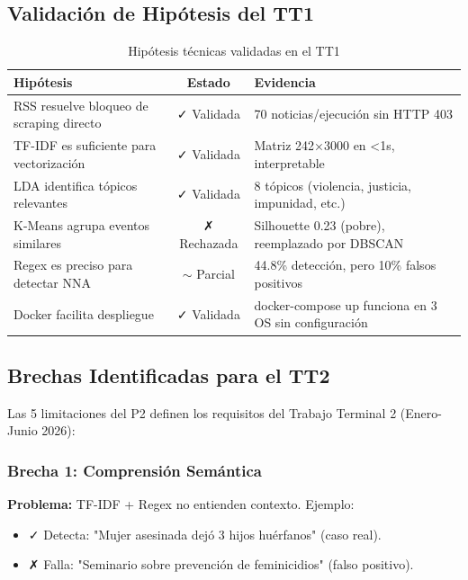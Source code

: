 \subsection{Validación de Hipótesis del TT1}

\begin{table}[h]
\centering
\caption{Hipótesis técnicas validadas en el TT1}
\begin{tabular}{|p{5cm}|c|p{5cm}|}
\hline
\textbf{Hipótesis} & \textbf{Estado} & \textbf{Evidencia} \\ \hline
RSS resuelve bloqueo de scraping directo & ✓ Validada & 70 noticias/ejecución sin HTTP 403 \\ \hline
TF-IDF es suficiente para vectorización & ✓ Validada & Matriz 242×3000 en <1s, interpretable \\ \hline
LDA identifica tópicos relevantes & ✓ Validada & 8 tópicos (violencia, justicia, impunidad, etc.) \\ \hline
K-Means agrupa eventos similares & ✗ Rechazada & Silhouette 0.23 (pobre), reemplazado por DBSCAN \\ \hline
Regex es preciso para detectar NNA & $\sim$ Parcial & 44.8\% detección, pero 10\% falsos positivos \\ \hline
Docker facilita despliegue & ✓ Validada & docker-compose up funciona en 3 OS sin configuración \\ \hline
\end{tabular}
\end{table}

\subsection{Brechas Identificadas para el TT2}

Las 5 limitaciones del P2 definen los requisitos del Trabajo Terminal 2 (Enero-Junio 2026):

\subsubsection{Brecha 1: Comprensión Semántica}

\textbf{Problema:} TF-IDF + Regex no entienden contexto. Ejemplo:
\begin{itemize}
    \item ✓ Detecta: "Mujer asesinada dejó 3 hijos huérfanos" (caso real).
    \item ✗ Falla: "Seminario sobre prevención de feminicidios" (falso positivo).
\end{itemize}

